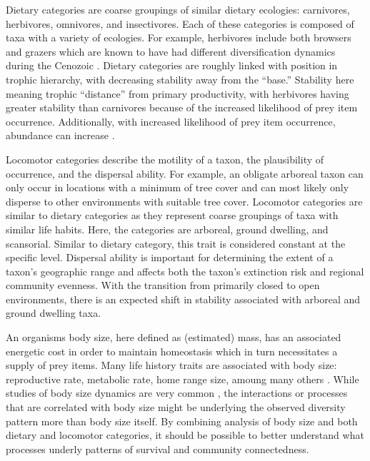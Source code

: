 \documentclass[12pt,letterpaper]{article}
\begin{document}
Dietary categories are coarse groupings of similar dietary ecologies: carnivores, herbivores, omnivores, and insectivores. Each of these categories is composed of taxa with a variety of ecologies. For example, herbivores include both browsers and grazers which are known to have had different diversification dynamics during the Cenozoic \citep{Janis2000}. Dietary categories are roughly linked with position in trophic hierarchy, with decreasing stability away from the ``base.'' Stability here meaning trophic ``distance'' from primary productivity, with herbivores having greater stability than carnivores because of the increased likelihood of prey item occurrence. Additionally, with increased likelihood of prey item occurrence, abundance can increase \citep{VanValen1989,Brown1987,Damuth1979,Silva1997,Janis2000}. 

Locomotor categories describe the motility of a taxon, the plausibility of occurrence, and the dispersal ability. For example, an obligate arboreal taxon can only occur in locations with a minimum of tree cover and can most likely only disperse to other environments with suitable tree cover. Locomotor categories are similar to dietary categories as they represent coarse groupings of taxa with similar life habits. Here, the categories are arboreal, ground dwelling, and scansorial. Similar to dietary category, this trait is considered constant at the specific level. Dispersal ability is important for determining the extent of a taxon's geographic range \citep{Birand2012,Jablonski2006a,Gaston2009} and affects both the taxon's extinction risk and regional community evenness. With the transition from primarily closed to open environments, there is an expected shift in stability associated with arboreal and ground dwelling taxa.

An organisms body size, here defined as (estimated) mass, has an associated energetic cost in order to maintain homeostasis which in turn necessitates a supply of prey items. Many life history traits are associated with body size: reproductive rate, metabolic rate, home range size, amoung many others \cite{Peters1983a,Damuth1979,Brown1987,Smith2004}. While studies of body size dynamics are very common \citep{Clauset2008a,Damuth1981a,Johnson2002b,Liow2008,Alroy2000g}, the interactions or processes that are correlated with body size might be underlying the observed diversity pattern more than body size itself. By combining analysis of body size and both dietary and locomotor categories, it should be possible to better understand what processes underly patterns of survival and community connectedness.
\end{document}
